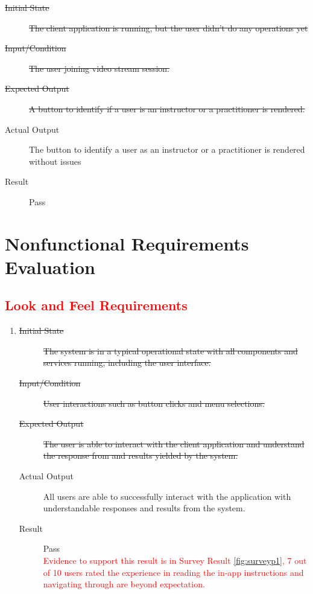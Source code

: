 \documentclass[12pt, titlepage]{article}
\newcommand{\rt}[1]{\textcolor{red}{#1}}
\begin{document}
\begin{enumerate}[FR-T1]
    \begin{description}
    \item[\sout{Initial State}] \sout{The client application is running, but the
        user didn’t do any operations yet}
		\item[\sout{Input/Condition}] \sout{The user joining video stream session.}
		\item[\sout{Expected Output}] \sout{A button to identify if a user is an
        instructor or a practitioner is rendered.}
		\item[Actual Output] The button to identify a user as an instructor or a
      practitioner is rendered without issues
    \item[Result] Pass
    \end{description}
  \end{enumerate}

  \section{Nonfunctional Requirements Evaluation}

  \rt{\subsection{Look and Feel Requirements}}
  \begin{enumerate}[NFR-T1]
    \item \label{NFRT1}
      \begin{description}
      \item[\sout{Initial State}] \sout{The system is in a typical operational
          state with all components and services running, including the user
          interface.}
      \item[\sout{Input/Condition}] \sout{User interactions such as button clicks
          and menu selections.}
      \item[\sout{Expected Output}] \sout{The user is able to interact with the
          client application and understand the response from and results
          yielded by the system.}
      \item[Actual Output] All users are able to successfully interact with the
        application with understandable responses and results from the system.
      \item[Result] Pass \\
      \rt{Evidence to support this result is in Survey Result \ref{fig:surveyp1},
        7 out of 10 users rated the experience in reading the in-app instructions and navigating through are beyond expectation.}

      
      \end{description}
  \end{enumerate}
\end{document}
